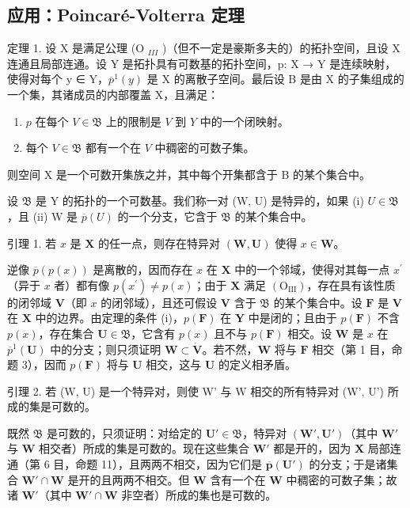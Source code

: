 \subsection{应用：Poincaré-Volterra 定理}

定理 1. 设 X 是满足公理 (O \(_{III}\) )（但不一定是豪斯多夫的）的拓扑空间，且设 X 连通且局部连通。设 Y 是拓扑具有可数基的拓扑空间，p: X → Y 是连续映射，使得对每个 y ∈ Y，\(\overline{p}^{1}(y)\) 是 X 的离散子空间。最后设 B 是由 X 的子集组成的一个集，其诸成员的内部覆盖 X，且满足：

\begin{enumerate}
\def\labelenumi{(\roman{enumi})}
\tightlist
\item
  \(p\) 在每个 \(V \in \mathfrak{B}\) 上的限制是 \(V\) 到 \(Y\) 中的一个闭映射。\\
\item
  每个 \(V \in \mathfrak{B}\) 都有一个在 \(V\) 中稠密的可数子集。
\end{enumerate}

则空间 X 是一个可数开集族之并，其中每个开集都含于 B 的某个集合中。

设 \(\mathfrak{B}\) 是 Y 的拓扑的一个可数基。我们称一对 (W, U) 是特异的，如果 (i) \(U \in \mathfrak{B}\)，且 (ii) W 是 \(\overline{p}(U)\) 的一个分支，它含于 \(\mathfrak{B}\) 的某个集合中。

引理 1. 若 \(x\) 是 \(\mathbf{X}\) 的任一点，则存在特异对 \((\mathbf{W}, \mathbf{U})\) 使得 \(x \in \mathbf{W}\)。

逆像 \(\overline{p} (p(x))\) 是离散的，因而存在 \(x\) 在 \(\mathbf{X}\) 中的一个邻域，使得对其每一点 \(x^{\prime}\)（异于 \(x\) 者）都有像 \(p(x^{\prime})\neq p(x)\)；由于 \(\mathbf{X}\) 满足 \((\mathrm{O}_{\mathrm{III}})\)，存在具有该性质的闭邻域 \(\mathbf{V}\)（即 \(x\) 的闭邻域），且还可假设 \(\mathbf{V}\) 含于 \(\mathfrak{B}\) 的某个集合中。设 \(\mathbf{F}\) 是 \(\mathbf{V}\) 在 \(\mathbf{X}\) 中的边界。由定理的条件 (i)，\(p(\mathbf{F})\) 在 \(\mathbf{Y}\) 中是闭的；且由于 \(p(\mathbf{F})\) 不含 \(p(x)\)，存在集合 \(\mathbf{U}\in \mathfrak{B}\)，它含有 \(p(x)\) 且不与 \(p(\mathbf{F})\) 相交。设 \(\mathbf{W}\) 是 \(x\) 在 \(\overline{p}^{1}(\mathbf{U})\) 中的分支；则只须证明 \(\mathbf{W}\subset \mathring{\mathbf{V}}\)。若不然，\(\mathbf{W}\) 将与 \(\mathbf{F}\) 相交（第 1 目，命题 3），因而 \(p(\mathbf{F})\) 将与 \(\mathbf{U}\) 相交，这与 \(\mathbf{U}\) 的定义相矛盾。

引理 2. 若 (W, U) 是一个特异对，则使 W' 与 W 相交的所有特异对 (W', U') 所成的集是可数的。

既然 \(\mathfrak{B}\) 是可数的，只须证明：对给定的 \(\mathbf{U}' \in \mathfrak{B}\)，特异对 \((\mathbf{W}', \mathbf{U}')\)（其中 \(\mathbf{W}'\) 与 \(\mathbf{W}\) 相交者）所成的集是可数的。现在这些集合 \(\mathbf{W}'\) 都是开的，因为 \(\mathbf{X}\) 局部连通（第 6 目，命题 11），且两两不相交，因为它们是 \(\overline{\boldsymbol{p}}(\mathbf{U}')\) 的分支；于是诸集合 \(\mathbf{W}' \cap \mathbf{W}\) 是开的且两两不相交。但 \(\mathbf{W}\) 含有一个在 \(\mathbf{W}\) 中稠密的可数子集；故诸 \(\mathbf{W}'\)（其中 \(\mathbf{W}' \cap \mathbf{W}\) 非空者）所成的集也是可数的。

